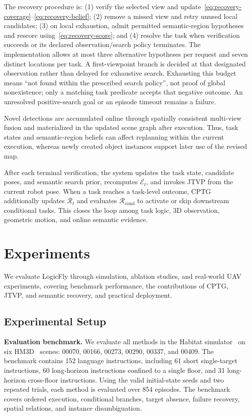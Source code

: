 \documentclass[letterpaper,10pt,journal]{IEEEtran}
\begin{document}
The recovery procedure is: (1) verify the selected view and update~\eqref{eq:recovery-coverage}--\eqref{eq:recovery-belief}; (2) remove a missed view and retry unused local candidates; (3) on local exhaustion, admit permitted semantic-region hypotheses and rescore using~\eqref{eq:recovery-score}; and (4) resolve the task when verification succeeds or its declared observation/search policy terminates. The implementation allows at most three alternative hypotheses per request and seven distinct locations per task. A first-viewpoint branch is decided at that designated observation rather than delayed for exhaustive search. Exhausting this budget means ``not found within the prescribed search policy'', not proof of global nonexistence; only a matching task predicate accepts that negative outcome. An unresolved positive-search goal or an episode timeout remains a failure.

Novel detections are accumulated online through spatially consistent multi-view fusion and materialized in the updated scene graph after execution. Thus, task states and semantic-region beliefs can affect replanning within the current execution, whereas newly created object instances support later use of the revised map.

After each terminal verification, the system updates the task state, candidate poses, and semantic search prior, recomputes $\mathcal E_t$, and invokes JTVP from the current robot pose. When a task reaches a task-level outcome, CPTG additionally updates $\mathcal R_t$ and evaluates $\mathcal R_{\mathrm{cond}}$ to activate or skip downstream conditional tasks. This closes the loop among task logic, 3D observation, geometric motion, and online semantic evidence.



\FloatBarrier
\section{Experiments}
We evaluate LogicFly through simulation, ablation studies, and real-world UAV experiments, covering benchmark performance, the contributions of CPTG, JTVP, and semantic recovery, and practical deployment.

\subsection{Experimental Setup}
\textbf{Evaluation benchmark.}
We evaluate all methods in the Habitat simulator~\cite{savva2019habitat} on six HM3D~\cite{ramakrishnan2021hm3d} scenes: 00070, 00166, 00273, 00290, 00337, and 00409. The benchmark contains 152 language instructions, including 61 short single-target instructions, 60 long-horizon instructions confined to a single floor, and 31 long-horizon cross-floor instructions. Using the valid initial-state seeds and two repeated trials, each method is evaluated over 854 episodes. The benchmark covers ordered execution, conditional branches, target absence, failure recovery, spatial relations, and instance disambiguation.
\end{document}
